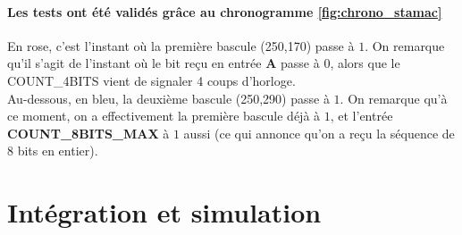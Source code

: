 \documentclass[a4paper]{article} %
\begin{document}
\begin{tcolorbox}[colframe=Monokaimagenta,colback=white]
\begin{figure}[H]
\label{fig:graphe_etat}
\end{figure}


\paragraph{Les tests ont été validés grâce au chronogramme \ref{fig:chrono_stamac}}
En rose, c'est l'instant où la première bascule (250,170) passe à $1$. On remarque qu'il s'agit de l'instant où le bit reçu en entrée \textbf{A} passe à $0$, alors que le COUNT\_4BITS vient de signaler 4 coups d'horloge.\\
Au-dessous, en bleu, la deuxième bascule (250,290) passe à $1$. On remarque qu'à ce moment, on a effectivement la première bascule déjà à $1$, et l'entrée \textbf{COUNT\_8BITS\_MAX} à $1$ aussi (ce qui annonce qu'on a reçu la séquence de 8 bits en entier).
\end{tcolorbox}

\section {Intégration et simulation}
\end{document}
